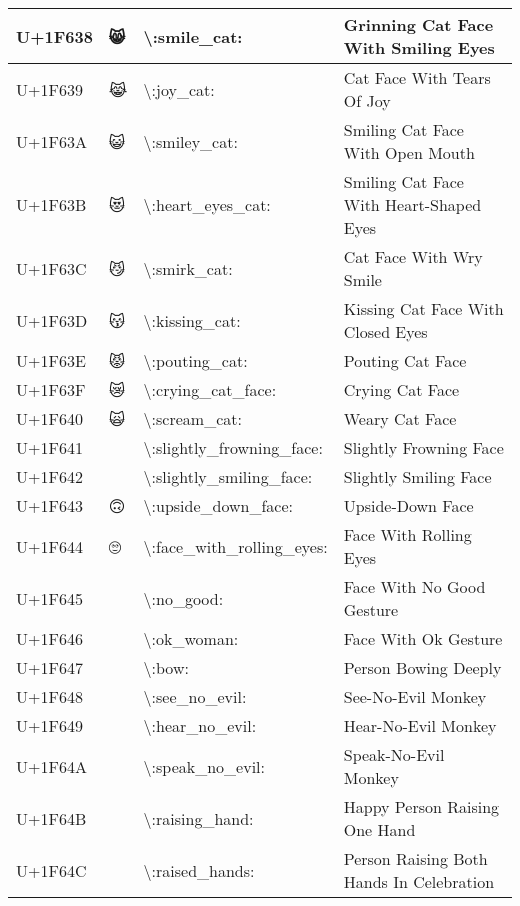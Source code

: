\begin{table}[h]
\begin{tabulary}{\linewidth}{|L|L|L|L|}
\hline
U+1F638 & 😸 & {\textbackslash}:smile\_cat: & Grinning Cat Face With Smiling Eyes \\
\hline
U+1F639 & 😹 & {\textbackslash}:joy\_cat: & Cat Face With Tears Of Joy \\
\hline
U+1F63A & 😺 & {\textbackslash}:smiley\_cat: & Smiling Cat Face With Open Mouth \\
\hline
U+1F63B & 😻 & {\textbackslash}:heart\_eyes\_cat: & Smiling Cat Face With Heart-Shaped Eyes \\
\hline
U+1F63C & 😼 & {\textbackslash}:smirk\_cat: & Cat Face With Wry Smile \\
\hline
U+1F63D & 😽 & {\textbackslash}:kissing\_cat: & Kissing Cat Face With Closed Eyes \\
\hline
U+1F63E & 😾 & {\textbackslash}:pouting\_cat: & Pouting Cat Face \\
\hline
U+1F63F & 😿 & {\textbackslash}:crying\_cat\_face: & Crying Cat Face \\
\hline
U+1F640 & 🙀 & {\textbackslash}:scream\_cat: & Weary Cat Face \\
\hline
U+1F641 & 🙁 & {\textbackslash}:slightly\_frowning\_face: & Slightly Frowning Face \\
\hline
U+1F642 & 🙂 & {\textbackslash}:slightly\_smiling\_face: & Slightly Smiling Face \\
\hline
U+1F643 & 🙃 & {\textbackslash}:upside\_down\_face: & Upside-Down Face \\
\hline
U+1F644 & 🙄 & {\textbackslash}:face\_with\_rolling\_eyes: & Face With Rolling Eyes \\
\hline
U+1F645 & 🙅 & {\textbackslash}:no\_good: & Face With No Good Gesture \\
\hline
U+1F646 & 🙆 & {\textbackslash}:ok\_woman: & Face With Ok Gesture \\
\hline
U+1F647 & 🙇 & {\textbackslash}:bow: & Person Bowing Deeply \\
\hline
U+1F648 & 🙈 & {\textbackslash}:see\_no\_evil: & See-No-Evil Monkey \\
\hline
U+1F649 & 🙉 & {\textbackslash}:hear\_no\_evil: & Hear-No-Evil Monkey \\
\hline
U+1F64A & 🙊 & {\textbackslash}:speak\_no\_evil: & Speak-No-Evil Monkey \\
\hline
U+1F64B & 🙋 & {\textbackslash}:raising\_hand: & Happy Person Raising One Hand \\
\hline
U+1F64C & 🙌 & {\textbackslash}:raised\_hands: & Person Raising Both Hands In Celebration \\
\hline

\end{tabulary}
\end{table}
